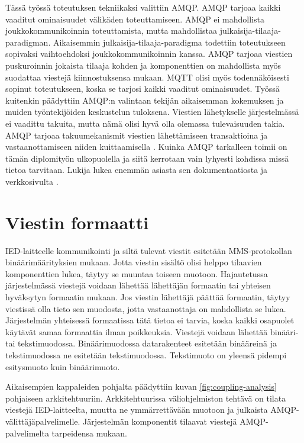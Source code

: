 Tässä työssä toteutuksen tekniikaksi valittiin AMQP. AMQP tarjoaa kaikki vaaditut ominaisuudet välikäden toteuttamiseen. AMQP ei mahdollista joukkokommunikoinnin toteuttamista, mutta mahdollistaa julkaisija-tilaaja-paradigman. Aikaisemmin julkaisija-ti\-laa\-ja-paradigma todettiin toteutukseen sopivaksi vaihtoehdoksi joukkokommunikoinnin kanssa. AMQP tarjoaa viestien puskuroinnin jokaista tilaaja kohden ja komponenttien on mahdollista myös suodattaa viestejä kiinnostuksensa mukaan. MQTT olisi myös todennäköisesti sopinut toteutukseen, koska se tarjosi kaikki vaaditut ominaisuudet. Työssä kuitenkin päädyttiin AMQP:n valintaan tekijän aikaisemman kokemuksen ja muiden työntekijöiden keskustelun tuloksena. Viestien lähetykselle järjestelmässä ei vaadittu takuita, mutta nämä olisi hyvä olla olemassa tulevaisuuden takia. AMQP tarjoaa takuumekanismit viestien lähettämiseen transaktioina ja vastaanottamiseen niiden kuittaamisella \cite[s.~14,21]{AMQP-specification}. Kuinka AMQP tarkalleen toimii on tämän diplomityön ulkopuolella ja siitä kerrotaan vain lyhyesti kohdissa missä tietoa tarvitaan. Lukija lukea enemmän asiasta sen dokumentaatiosta \cite{AMQP-specification} ja verkkosivulta \cite{amqp-homepage}.


\section{Viestin formaatti}
IED-laitteelle kommunikointi ja siltä tulevat viestit esitetään MMS-protokollan binäärimäärityksien mukaan. Jotta viestin sisältö olisi helppo tilaavien komponenttien lukea, täytyy se muuntaa toiseen muotoon. Hajautetussa järjestelmässä viestejä voidaan lähettää lähettäjän formaatin tai yhteisen hyväksytyn formaatin mukaan. Jos viestin lähettäjä päättää formaatin, täytyy viestissä olla tieto sen muodosta, jotta vastaanottaja on mahdollista se lukea. Järjestelmän yhteisessä formaatissa tätä tietoa ei tarvia, koska kaikki osapuolet käytävät samaa formaattia ilman poikkeuksia. Viestejä voidaan lähettää binääri- tai tekstimuodossa. Binäärimuodossa datarakenteet esitetään binääreinä ja tekstimuodossa ne esitetään tekstimuodossa. Tekstimuoto on yleensä pidempi esitysmuoto kuin binäärimuoto.

Aikaisempien kappaleiden pohjalta päädyttiin kuvan \ref{fig:coupling-analysis} pohjaiseen arkkitehtuuriin. Arkkitehtuurissa väliohjelmiston tehtävä on tilata viestejä IED-laitteelta, muutta ne ymmärrettävään muotoon ja julkaista AMQP-välittäjäpalvelimelle. Järjestelmän komponentit tilaavat viestejä AMQP-palvelimelta tarpeidensa mukaan.

